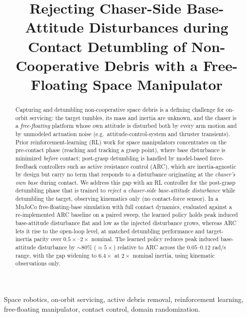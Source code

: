 \documentclass[conference]{IEEEtran}
\begin{document}
\title{Rejecting Chaser-Side Base-Attitude Disturbances during Contact Detumbling
of Non-Cooperative Debris with a Free-Floating Space Manipulator}

\author{
}

\maketitle

\begin{abstract}
Capturing and detumbling non-cooperative space debris is a defining challenge for on-orbit
servicing: the target tumbles, its mass and inertia are unknown, and the chaser is a
\emph{free-floating} platform whose own attitude is disturbed both by every arm motion and by
unmodeled actuation noise (e.g.\ attitude-control-system and thruster transients). Prior
reinforcement-learning (RL) work for space manipulators concentrates on the pre-contact phase
(reaching and tracking a grasp point), where base disturbance is minimized \emph{before} contact;
post-grasp detumbling is handled by model-based force-feedback controllers such as active
resistance control (ARC), which are inertia-agnostic by design but carry no term that responds to
a disturbance originating at the \emph{chaser's own base} during contact. We address this gap with
an RL controller for the post-grasp detumbling phase that is trained to \emph{reject a chaser-side
base-attitude disturbance} while detumbling the target, observing kinematics only (no contact-force
sensor). In a MuJoCo free-floating-base simulation with full contact dynamics, evaluated against a
re-implemented ARC baseline on a paired sweep, the learned policy holds peak induced base-attitude
disturbance flat and low as the injected disturbance grows, whereas ARC lets it rise to the
open-loop level, at matched detumbling performance and target-inertia parity over
$0.5\times$--$2\times$ nominal. The learned policy reduces peak induced base-attitude disturbance by
$\sim 80\%$ ($\approx 5\times$) relative to ARC across the $0.05$--$0.12$ rad/s range, with the gap
widening to $6.4\times$ at $2\times$ nominal inertia, using kinematic observations only.
\end{abstract}

\begin{IEEEkeywords}
Space robotics, on-orbit servicing, active debris removal, reinforcement learning,
free-floating manipulator, contact control, domain randomization.
\end{IEEEkeywords}
\end{document}
